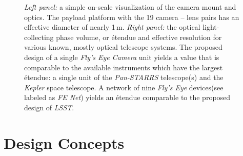 \begin{figure}
\begin{center}
%
\end{center}
\caption{%
{\it Left panel:} a simple on-scale visualization of the camera mount and optics. The payload platform with the 19 camera -- lens pairs has an effective diameter of nearly 1\,m. {\it Right panel:} the optical light-collecting phase volume, or \'etendue and effective resolution for various known, mostly optical telescope systems. The proposed design of a single {\it Fly's Eye Camera} unit yields a value that is comparable to the available instruments which have the largest \'etendue: a single unit of the \emph{Pan-STARRS} telescope(s) and the \emph{Kepler} space telescope. A network of nine {\it Fly's Eye} devices(see labeled as {\it FE Net}) yields an \'etendue comparable to the proposed design of \emph{LSST}.}
\label{fig:flyseye}
\end{figure}

\section{Design Concepts}

